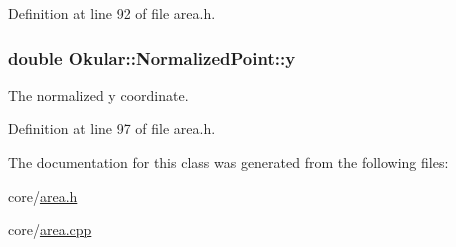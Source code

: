 Definition at line 92 of file area.\+h.

\hypertarget{classOkular_1_1NormalizedPoint_ac2276daabda627d5f82bb1532c293047}{
\subsubsection[{y}]{\setlength{\rightskip}{0pt plus 5cm}double Okular\+::\+Normalized\+Point\+::y}}\label{classOkular_1_1NormalizedPoint_ac2276daabda627d5f82bb1532c293047}
The normalized y coordinate. 

Definition at line 97 of file area.\+h.



The documentation for this class was generated from the following files\+:\begin{DoxyCompactItemize}
\item 
core/\hyperlink{area_8h}{area.\+h}\item 
core/\hyperlink{area_8cpp}{area.\+cpp}\end{DoxyCompactItemize}
